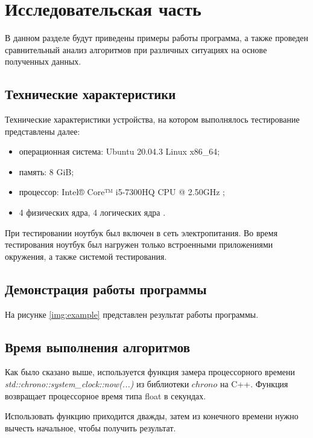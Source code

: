 \chapter{Исследовательская часть}

В данном разделе будут приведены примеры работы программа, а также проведен сравнительный анализ алгоритмов при различных ситуациях на основе полученных данных.

\section{Технические характеристики}

Технические характеристики устройства, на котором выполнялось тестирование представлены далее:

\begin{itemize}
    \item операционная система: Ubuntu 20.04.3 \cite{ubuntu} Linux \cite{linux} x86\_64;
    \item память: 8 GiB;
    \item процессор: Intel® Core™ i5-7300HQ CPU @ 2.50GHz \cite{intel};
    \item 4 физических ядра, 4 логических ядра \cite{intel}.
\end{itemize}

При тестировании ноутбук был включен в сеть электропитания. Во время тестирования ноутбук был нагружен только встроенными приложениями окружения, а также системой тестирования.

\section{Демонстрация работы программы}

На рисунке \ref{img:example} представлен результат работы программы.

\clearpage

\section{Время выполнения алгоритмов}

Как было сказано выше, используется функция замера процессорного времени \textit{std::chrono::system\_clock::now(...)} из библиотеки $chrono$ на C++. Функция возвращает процессорное время типа float в секундах.

Использовать функцию приходится дважды, затем из конечного времени нужно вычесть начальное, чтобы получить результат.

